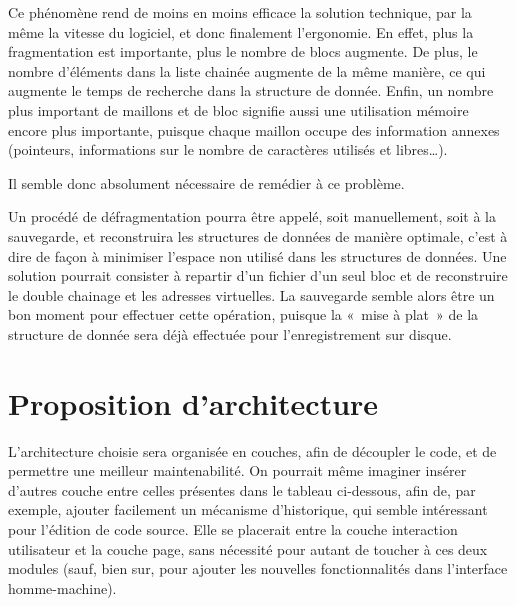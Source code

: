 Ce phénomène rend de moins en moins efficace la solution technique, par la
même la vitesse du logiciel, et donc finalement l'ergonomie. En effet,
plus la fragmentation est importante, plus le nombre de blocs augmente. De plus,
le nombre d'éléments dans la liste chainée augmente de la même manière, ce
qui augmente le temps de recherche dans la structure de donnée.
Enfin, un nombre plus important de maillons et de bloc signifie aussi une
utilisation mémoire encore plus importante, puisque chaque maillon occupe des
information annexes (pointeurs, informations sur le nombre de caractères
utilisés et libres\ldots).

Il semble donc absolument nécessaire de remédier à ce problème.

Un procédé de défragmentation pourra être appelé, soit manuellement, soit à la
sauvegarde, et reconstruira les structures de données de manière optimale, c'est
à dire de façon à minimiser l'espace non utilisé dans les structures de données.
Une solution pourrait consister à repartir d'un fichier d'un seul bloc et de
reconstruire le double chainage et les adresses virtuelles. La sauvegarde semble
alors être un bon moment pour effectuer cette opération, puisque la «~mise à
plat~» de la structure de donnée sera déjà effectuée pour l'enregistrement sur
disque.



\section{Proposition d'architecture}
L'architecture choisie sera organisée en couches, afin de découpler le code, et de
permettre une meilleur maintenabilité. On pourrait même imaginer insérer
d'autres couche entre celles présentes dans le tableau ci-dessous, afin de, par
exemple, ajouter facilement un mécanisme d'historique, qui semble intéressant
pour l'édition de code source. Elle se placerait entre la couche interaction
utilisateur et la couche page, sans nécessité pour autant de toucher à ces deux
modules (sauf, bien sur, pour ajouter les nouvelles fonctionnalités dans
l'interface homme-machine).









